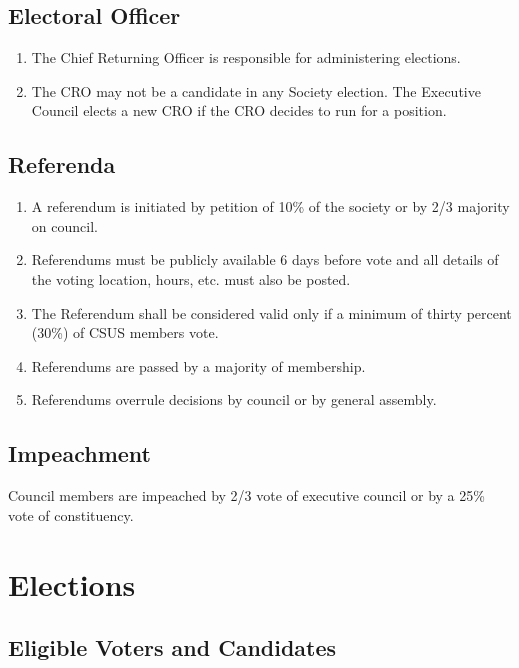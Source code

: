 \subsection{Electoral Officer}\label{electoral-officer}

\begin{enumerate}
\def\labelenumi{\arabic{enumi}.}
\item
  The Chief Returning Officer is responsible for administering
  elections.
\item
  The CRO may not be a candidate in any Society election. The Executive
  Council elects a new CRO if the CRO decides to run for a position.
\end{enumerate}

\subsection{Referenda}\label{referenda}

\begin{enumerate}
\def\labelenumi{\arabic{enumi}.}
\item
  A referendum is initiated by petition of 10\% of the society or by 2/3
  majority on council.
\item
  Referendums must be publicly available 6 days before vote and all
  details of the voting location, hours, etc. must also be posted.
\item
  The Referendum shall be considered valid only if a minimum of thirty
  percent (30\%) of CSUS members vote.
\item
  Referendums are passed by a majority of membership.
\item
  Referendums overrule decisions by council or by general assembly.
\end{enumerate}

\subsection{Impeachment}\label{impeachment}

Council members are impeached by 2/3 vote of executive council or by a
25\% vote of constituency.

\section{Elections}\label{elections}

\subsection{Eligible Voters and
Candidates}\label{eligible-voters-and-candidates}


